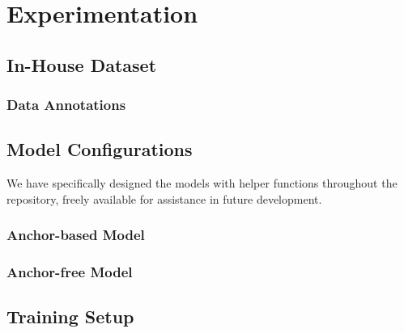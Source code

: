 \section{Experimentation}

\subsection{In-House Dataset}







\subsubsection{Data Annotations}



\subsection{Model Configurations}

We have specifically designed the models with helper functions throughout the repository, freely available for assistance in future development.

\subsubsection{Anchor-based Model}

\subsubsection{Anchor-free Model}

\subsection{Training Setup}

